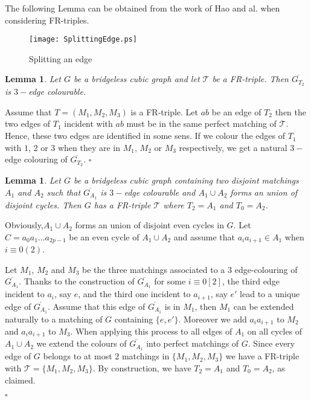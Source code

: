 \documentclass{amsart}
\newtheorem{lem}[thm]{Lemma}
\theoremstyle{definition}
\theoremstyle{remark}
\newenvironment{prf}{{\bf \noindent Proof } }{\hfill$\square$\\}
\begin{document}
The following Lemma can be obtained from the work of Hao and
al. \cite{HaoNiuWanZhaZha2009} when considering FR-triples.

\begin{figure}
\texttt{[image: SplittingEdge.ps]}
\caption{ Splitting an edge}
\label{Figure:SplittingEdge}
\end{figure}

\begin{lem} \label{Lemma:FRGBarreT2}
Let $G$ be a bridgeless cubic graph and let $\mathcal T$ be a
FR-triple. Then $\overline{G_{T_{2}}}$ is $3-$edge colourable.
\end{lem}
\begin{prf}



Assume that $T=(M_{1}, M_{2},M_{3})$ is a FR-triple.  Let $ab$ be an
edge of $T_{2}$ then the two edges of $T_{1}$ incident with $ab$
must be in the same perfect matching of $\mathcal T$. Hence, these
two edges are identified in some sens.  If we colour the edges of
$T_{1}$ with $1$, $2$ or $3$ when they are in $M_{1}$, $M_{2}$ or
$M_{3}$ respectively, we get a natural $3-$edge colouring of
$\overline{G_{T_{2}}}$.
\end{prf}

\begin{lem} \label{Lemma:GBarreA1FR}
Let $G$ be a bridgeless cubic graph containing  two disjoint
matchings $A_{1}$ and $A_{2}$ such that $\overline{G_{A_{1}}}$ is
$3-$edge colourable and $A_{1} \cup A_{2}$ forms an union of disjoint cycles. Then $G$ has a FR-triple $\mathcal T$  where
$T_{2}=A_{1}$ and $T_{0}=A_{2}$.
\end{lem}
\begin{prf}
Obviously,$A_{1} \cup A_{2}$ forms an union of disjoint even cycles
in $G$. Let $C=a_{0}a_{1} \ldots a_{2p-1}$ be an even cycle of
$A_{1} \cup A_{2}$ and assume that $a_{i}a_{i+1} \in A_{1}$ when $i
\equiv 0 (2)$.

Let $M_{1}$, $M_{2}$ and  $M_{3}$ be the three matchings associated
to a $3$ edge-colouring of $\overline{G_{A_1}}$.  Thanks to the
construction of $\overline{G_{A_1}}$ for some $i\equiv 0[2]$, the
third edge incident to $a_i$, say $e$, and the third one incident to
$a_{i+1}$, say $e'$ lead to a unique  edge of $\overline{G_{A_1}}$.
Assume that this edge of $\overline{G_{A_1}}$ is in $M_{1}$, then
$M_{1}$ can be extended naturally to a matching of $G$ containing
$\{e,e'\}$. Moreover we add $a_ia_{i+1}$ to $M_{2}$ and $a_ia_{i+1}$
to $M_{3}$. When applying this process to all edges of $A_1$ on all
cycles of $A_1\cup A_2$ we extend the colours of
$\overline{G_{A_1}}$ into perfect matchings of $G$. Since every edge
of $G$ belongs to at most $2$ matchings in $\{M_{1}, M_{2}, M_{3}\}$
we have a FR-triple with $\mathcal T=\{M_{1}, M_{2}, M_{3}\}$. By
construction, we have $T_{2}=A_{1}$ and $T_{0}=A_{2}$, as claimed.

\end{prf}
\end{document}
